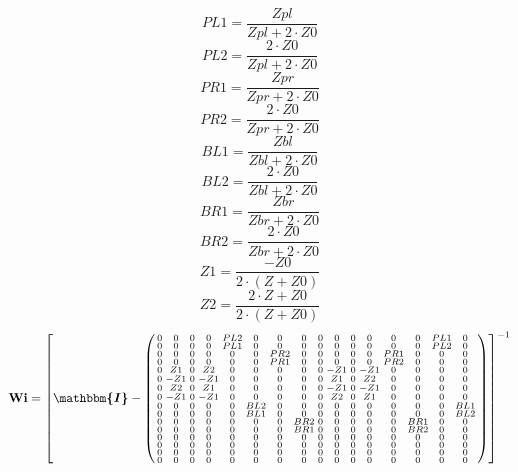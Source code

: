 \[ PL1=\frac{Zpl}{Zpl+2\cdot Z0} \]
\[ PL2=\frac{2\cdot Z0}{Zpl+2\cdot Z0} \]
\[ PR1=\frac{Zpr}{Zpr+2\cdot Z0} \]
\[ PR2=\frac{2\cdot Z0}{Zpr+2\cdot Z0} \]
\[ BL1=\frac{Zbl}{Zbl+2\cdot Z0} \]
\[ BL2=\frac{2\cdot Z0}{Zbl+2\cdot Z0} \]
\[ BR1=\frac{Zbr}{Zbr+2\cdot Z0} \]
\[ BR2=\frac{2\cdot Z0}{Zbr+2\cdot Z0} \]
\[ Z1=\frac{-Z0}{2\cdot \left(Z+Z0\right)} \]
\[ Z2=\frac{2\cdot Z+Z0}{2\cdot \left(Z+Z0\right)} \]
\[ \mathbf{Wi} =  \left[ \boldsymbol{\mathbbm{I}}  -
\left(\begin{smallmatrix} 0 & 0 & 0 & 0 & PL2 & 0 & 0 & 0 & 0 & 0 & 0
& 0 & 0 & 0 & PL1 & 0 \\ 0 & 0 & 0 & 0 & PL1 & 0 & 0 & 0 & 0 & 0 & 0 &
0 & 0 & 0 & PL2 & 0 \\ 0 & 0 & 0 & 0 & 0 & 0 & PR2 & 0 & 0 & 0 & 0 & 0
& PR1 & 0 & 0 & 0 \\ 0 & 0 & 0 & 0 & 0 & 0 & PR1 & 0 & 0 & 0 & 0 & 0 &
PR2 & 0 & 0 & 0 \\ 0 & Z1 & 0 & Z2 & 0 & 0 & 0 & 0 & 0 & -Z1 & 0 & -Z1
& 0 & 0 & 0 & 0 \\ 0 & -Z1 & 0 & -Z1 & 0 & 0 & 0 & 0 & 0 & Z1 & 0 & Z2
& 0 & 0 & 0 & 0 \\ 0 & Z2 & 0 & Z1 & 0 & 0 & 0 & 0 & 0 & -Z1 & 0 & -Z1
& 0 & 0 & 0 & 0 \\ 0 & -Z1 & 0 & -Z1 & 0 & 0 & 0 & 0 & 0 & Z2 & 0 & Z1
& 0 & 0 & 0 & 0 \\ 0 & 0 & 0 & 0 & 0 & BL2 & 0 & 0 & 0 & 0 & 0 & 0 & 0
& 0 & 0 & BL1 \\ 0 & 0 & 0 & 0 & 0 & BL1 & 0 & 0 & 0 & 0 & 0 & 0 & 0 &
0 & 0 & BL2 \\ 0 & 0 & 0 & 0 & 0 & 0 & 0 & BR2 & 0 & 0 & 0 & 0 & 0 &
BR1 & 0 & 0 \\ 0 & 0 & 0 & 0 & 0 & 0 & 0 & BR1 & 0 & 0 & 0 & 0 & 0 &
BR2 & 0 & 0 \\ 0 & 0 & 0 & 0 & 0 & 0 & 0 & 0 & 0 & 0 & 0 & 0 & 0 & 0 &
0 & 0 \\ 0 & 0 & 0 & 0 & 0 & 0 & 0 & 0 & 0 & 0 & 0 & 0 & 0 & 0 & 0 & 0
\\ 0 & 0 & 0 & 0 & 0 & 0 & 0 & 0 & 0 & 0 & 0 & 0 & 0 & 0 & 0 & 0 \\ 0
& 0 & 0 & 0 & 0 & 0 & 0 & 0 & 0 & 0 & 0 & 0 & 0 & 0 & 0 & 0
\end{smallmatrix}\right) \right]^{-1}  \]
